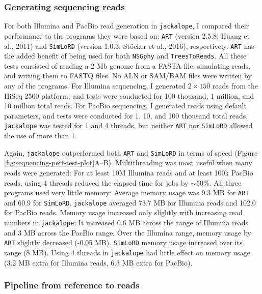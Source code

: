 \documentclass[12pt,]{article}
\begin{document}
\hypertarget{generating-sequencing-reads}{%
\subsubsection{Generating sequencing reads}\label{generating-sequencing-reads}}

For both Illumina and PacBio read generation in \texttt{jackalope}, I compared their performance
to the programs they were based on:
\texttt{ART} (version 2.5.8; Huang et al., 2011) and
\texttt{SimLoRD} (version 1.0.3; Stöcker et al., 2016), respectively.
\texttt{ART} has the added benefit of being used for both \texttt{NSGphy} and \texttt{TreesToReads}.
All these tests consisted of reading a 2 Mb genome from a FASTA file, simulating
reads, and writing them to FASTQ files.
No ALN or SAM/BAM files were written by any of the programs.
For Illumina sequencing, I generated \(2 \times 150\) reads from the HiSeq 2500 platform,
and tests were conducted for 100 thousand, 1 million, and 10 million total reads.
For PacBio sequencing, I generated reads using default parameters,
and tests were conducted for 1, 10, and 100 thousand total reads.
\texttt{jackalope} was tested for 1 and 4 threads, but
neither \texttt{ART} nor \texttt{SimLoRD} allowed the use of more than 1.

Again, \texttt{jackalope} outperformed both \texttt{ART} and \texttt{SimLoRD} in terms of speed
(Figure \ref{fig:sequencing-perf-test-plot}A--B).
Multithreading was most useful when many reads were generated:
For at least 10M Illumina reads and at least 100k PacBio reads, using 4 threads
reduced the elapsed time for jobs by \(\sim 50 \%\).
All three programs used very little memory:
Average memory usage was 9.3 MB for \texttt{ART} and
60.9 for \texttt{SimLoRD}.
\texttt{jackalope} averaged 73.7 MB for Illumina reads and
102.0 for PacBio reads.
Memory usage increased only slightly with increasing read numbers in \texttt{jackalope}:
It increased 0.6 MB across the range of Illumina reads and 3 MB across the PacBio range.
Over the Illumina range, memory usage by \texttt{ART} slightly decreased
(-0.05 MB).
\texttt{SimLoRD} memory usage increased over its range
(8 MB).
Using 4 threads in \texttt{jackalope} had little effect on memory usage
(3.2 MB extra for Illumina reads,
6.3 MB extra for PacBio).

\hypertarget{pipeline-from-reference-to-reads}{%
\subsubsection{Pipeline from reference to reads}\label{pipeline-from-reference-to-reads}}
\end{document}
